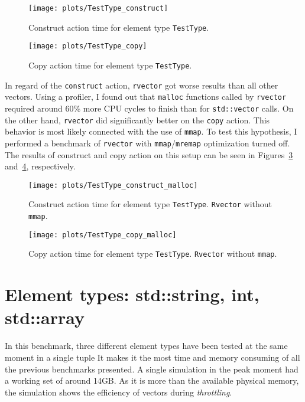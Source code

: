 \documentclass[inz, english, shortabstract]{iithesis}
\begin{document}
\begin{figure}[h!]
\texttt{[image: plots/TestType\_construct]}
\caption{Construct action time for element type \lstinline{TestType}{}.}
\label{TestType_construct}
\end{figure}

\begin{figure}[h!]
\texttt{[image: plots/TestType\_copy]}
\caption{Copy action time for element type \lstinline{TestType}{}.}
\label{TestType_copy}
\end{figure}

In regard of the {\tt construct} action, {\tt rvector} got worse results than all other vectors.
Using a profiler, I found out that {\tt malloc} functions called by {\tt rvector} required around 60\% more CPU cycles to finish than for {\tt std::vector} calls. On the other hand, {\tt rvector} did significantly better on the {\tt copy} action.
This behavior is most likely connected with the use of {\tt mmap}.
To test this hypothesis, I performed a benchmark of {\tt rvector} with {\tt mmap}/{\tt mremap} optimization turned off.
The results of construct and copy action on this setup can be seen in Figures~\ref{TestType_construct_malloc} and~\ref{TestType_copy_malloc}, respectively.

\begin{figure}[h!]
\texttt{[image: plots/TestType\_construct\_malloc]}
\caption{Construct action time for element type \lstinline{TestType}. {\tt Rvector} without {\tt mmap}.}
\label{TestType_construct_malloc}
\end{figure}

\begin{figure}[h!]
\texttt{[image: plots/TestType\_copy\_malloc]}
\caption{Copy action time for element type \lstinline{TestType}. {\tt Rvector} without {\tt mmap}.}
\label{TestType_copy_malloc}
\end{figure}

\clearpage
\section{Element types: std::string, int, std::array}

In this benchmark, three different element types have been tested at the same moment in a single tuple
It makes it the most time and memory consuming of all the previous benchmarks presented.
A single simulation in the peak moment had a working set of around 14GB.
As it is more than the available physical memory, the simulation shows the efficiency of vectors during \emph{throttling}.
\end{document}

